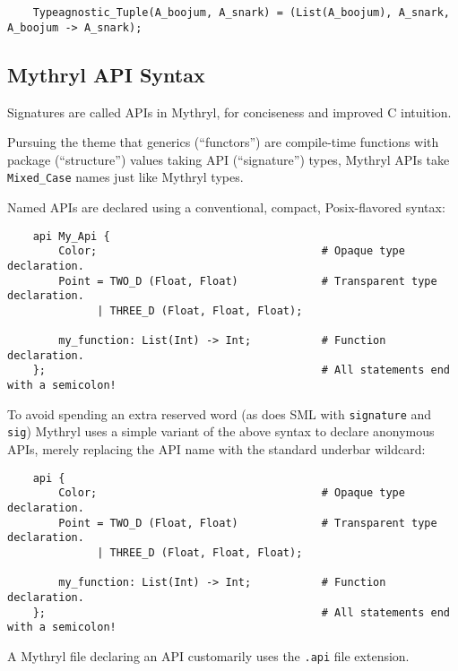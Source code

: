 \begin{verbatim}
    Typeagnostic_Tuple(A_boojum, A_snark) = (List(A_boojum), A_snark, A_boojum -> A_snark);
\end{verbatim}


\cutend*

\subsection{Mythryl API Syntax}

Signatures are called APIs in Mythryl, for conciseness and improved C intuition. 

Pursuing the theme that generics (``functors'') are compile-time functions with 
package (``structure'') values taking API (``signature'') types, Mythryl APIs take 
{\tt Mixed\_Case} names just like Mythryl types.

Named APIs are declared using a conventional, compact, Posix-flavored syntax:

\begin{verbatim}
    api My_Api {
        Color;                                   # Opaque type declaration.
        Point = TWO_D (Float, Float)             # Transparent type declaration.
              | THREE_D (Float, Float, Float);   
        
        my_function: List(Int) -> Int;           # Function declaration.
    };                                           # All statements end with a semicolon!
\end{verbatim}

To avoid spending an extra reserved word (as does {\sc SML} with {\tt signature} and {\tt sig}) 
Mythryl uses a simple variant of the above syntax to declare anonymous APIs, merely replacing 
the API name with the standard underbar wildcard:

\begin{verbatim}
    api {
        Color;                                   # Opaque type declaration.
        Point = TWO_D (Float, Float)             # Transparent type declaration.
              | THREE_D (Float, Float, Float);   
        
        my_function: List(Int) -> Int;           # Function declaration.
    };                                           # All statements end with a semicolon!
\end{verbatim}

A Mythryl file declaring an API customarily uses the {\tt .api} file extension.

